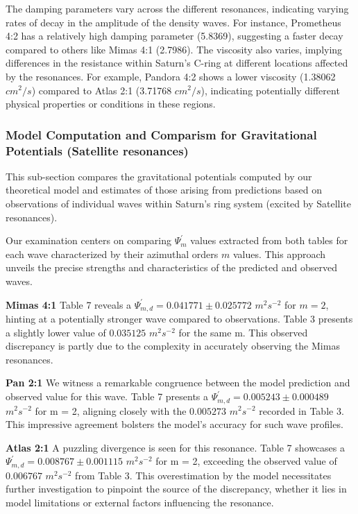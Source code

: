 \documentclass{article}
\begin{document}
The damping parameters vary across the different resonances, indicating varying rates of decay in the amplitude of the density waves. For instance, Prometheus 4:2 has a relatively high damping parameter (5.8369), suggesting a faster decay compared to others like Mimas 4:1 (2.7986). The viscosity also varies, implying differences in the resistance within Saturn's C-ring at different locations affected by the resonances. For example, Pandora 4:2 shows a lower viscosity (1.38062 $cm^{2}/s$) compared to Atlas 2:1 (3.71768 $cm^{2}/s$), indicating potentially different physical properties or conditions in these regions.


\subsubsection{Model Computation and Comparism for Gravitational Potentials (Satellite resonances)}

This sub-section compares the gravitational potentials computed by our theoretical model and estimates of those arising from predictions based on observations of individual waves within Saturn's ring system (excited by Satellite resonances).

Our examination centers on comparing $\Psi_{m}^{'}$ values extracted from both tables for each wave characterized by their azimuthal orders $m$ values. This approach unveils the precise strengths and characteristics of the predicted and observed waves.

\textbf{Mimas 4:1}
Table 7 reveals a $\Psi_{m,d}^{'} = 0.041771 \pm 0.025772$ $m^{2}s^{-2}$ for $m = 2$, hinting at a potentially stronger wave compared to observations. Table 3 presents a slightly lower value of $0.035125$ $m^{2}s^{-2}$ for the same m. This observed discrepancy is partly due to the complexity in accurately observing the Mimas resonances.

\textbf{Pan 2:1}
We witness a remarkable congruence between the model prediction and observed value for this wave. Table 7 presents a $\Psi_{m,d}^{'} = 0.005243 \pm 0.000489$ $m^{2}s^{-2}$ for m = 2, aligning closely with the $0.005273$ $m^{2}s^{-2}$ recorded in Table 3. This impressive agreement bolsters the model's accuracy for such wave profiles.

\textbf{Atlas 2:1}
A puzzling divergence is seen for this resonance. Table 7 showcases a $\Psi_{m,d}^{'} = 0.008767 \pm 0.001115$ $m^{2}s^{-2}$ for m = 2, exceeding the observed value of $0.006767$ $m^{2}s^{-2}$ from Table 3. This overestimation by the model necessitates further investigation to pinpoint the source of the discrepancy, whether it lies in model limitations or external factors influencing the resonance.
\end{document}
